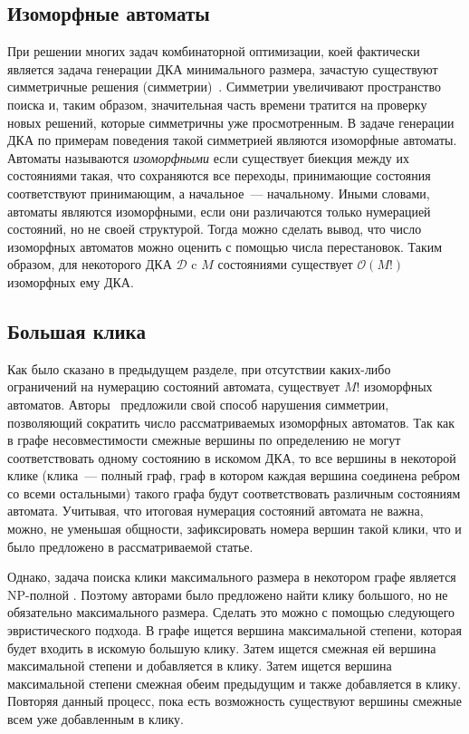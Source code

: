 \subsection{Изоморфные автоматы}
\label{sec:review:sym-breaking:isomorphic-automata}


При решении многих задач комбинаторной оптимизации, коей фактически является задача генерации ДКА минимального размера, зачастую существуют симметричные решения (симметрии)~\cite{DBLP:conf/aaai/Walsh12}.
Симметрии увеличивают пространство поиска и, таким образом, значительная часть времени тратится на проверку новых решений, которые симметричны уже просмотренным.
В задаче генерации ДКА по примерам поведения такой симметрией являются изоморфные автоматы.
Автоматы называются \emph{изоморфными} если существует биекция между их состояниями такая, что сохраняются все переходы, принимающие состояния соответствуют принимающим, а начальное~--- начальному.
Иными словами, автоматы являются изоморфными, если они различаются только нумерацией состояний, но не своей структурой.
Тогда можно сделать вывод, что число изоморфных автоматов можно оценить с помощью числа перестановок.
Таким образом, для некоторого ДКА $\mathcal{D}$ c $M$ состояниями существует $\mathcal{O}\left(M!\right)$ изоморфных ему ДКА.


\subsection{Большая клика}
\label{sec:review:sym-breaking:large-clique}

Как было сказано в предыдущем разделе, при отсутствии каких-либо ограничений на нумерацию состояний автомата, существует $M!$ изоморфных автоматов.
Авторы~\cite{heule-icgi10} предложили свой способ нарушения симметрии, позволяющий сократить число рассматриваемых изоморфных автоматов.
Так как в графе несовместимости смежные вершины по определению не могут соответствовать одному состоянию в искомом ДКА, то все вершины в некоторой клике (клика~{---} полный граф, граф в котором каждая вершина соединена ребром со всеми остальными)  такого графа будут соответствовать различным состояниям автомата.
Учитывая, что итоговая нумерация состояний автомата не важна, можно, не уменьшая общности, зафиксировать номера вершин такой клики, что и было предложено в рассматриваемой статье.

Однако, задача поиска клики максимального размера в некотором графе является NP-полной .
Поэтому авторами было предложено найти клику большого, но не обязательно максимального размера.
Сделать это можно с помощью следующего эвристического подхода.
В графе ищется вершина максимальной степени, которая будет входить в искомую большую клику.
Затем ищется смежная ей вершина максимальной степени и добавляется в клику.
Затем ищется вершина максимальной степени смежная обеим предыдущим и также добавляется в клику. 
Повторяя данный процесс, пока есть возможность существуют вершины смежные всем уже добавленным в клику.

